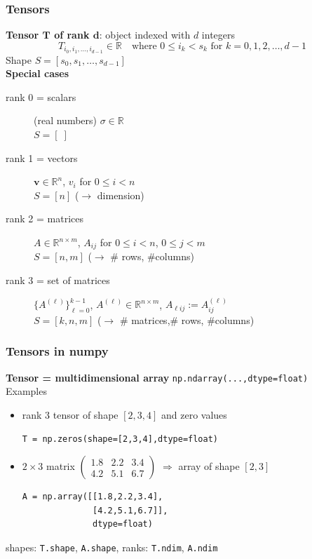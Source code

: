 \documentclass{beamer}
\begin{document}

\begin{frame}[fragile]
  \frametitle{Tensors}
\textbf{Tensor $\boldsymbol{T}$ of rank $\boldsymbol{d}$}: object indexed with $d$ integers 
$$
T_{i_0,i_1,\dots,i_{d-1}}\in \mathbb{R} \quad{\text{where $0\le i_k < s_k$ for $k=0,1,2,\dots,d-1$}}
$$
Shape $S = [s_0,s_1,\dots,s_{d-1}]$\\[2ex]
\textbf{Special cases}
\begin{description}
\item[rank 0 = scalars] (real numbers) $\sigma\in\mathbb{R}$\\
$S = [\;]$
\item[rank 1 = vectors] $\boldsymbol{v}\in \mathbb{R}^n$, $v_i$ for $0\le i< n$\\
$S = [n]$ \quad ($\rightarrow$ dimension)
\item[rank 2 = matrices] $A\in \mathbb{R}^{n\times m}$, $A_{ij}$ for $0\le i<n$, $0\le j <m$\\ $S=[n,m]$ \quad ($\rightarrow$ \# rows, \#columns)
\item[rank 3 = set of matrices] $\{A^{(\ell)}\}_{\ell=0}^{k-1}$, $A^{(\ell)}\in \mathbb{R}^{n\times m}$, $A_{\ell ij}:=A^{(\ell)}_{ij}$\\ $S=[k,n,m]$ \quad ($\rightarrow$ \# matrices,\# rows, \#columns)
\end{description}
\end{frame}


\begin{frame}[fragile]
  \frametitle{Tensors in numpy}
  \textbf{Tensor = multidimensional array} \lstinline{np.ndarray(...,dtype=float)}\\[2ex]
  Examples
  \begin{itemize}
  \item  rank 3 tensor of shape $[2,3,4]$ and zero values
  \begin{lstlisting}
T = np.zeros(shape=[2,3,4],dtype=float)    
  \end{lstlisting}
  \item $2\times 3$ matrix $\begin{pmatrix}1.8 & 2.2 & 3.4 \\ 4.2 & 5.1 & 6.7\end{pmatrix}$ $\Rightarrow$ array of shape $[2,3]$
\begin{lstlisting}
A = np.array([[1.8,2.2,3.4],
              [4.2,5.1,6.7]],
              dtype=float)
  \end{lstlisting}
\end{itemize}
shapes: \lstinline{T.shape}, \lstinline{A.shape}, ranks: \lstinline{T.ndim}, \lstinline{A.ndim}

\end{frame}
\end{document}
